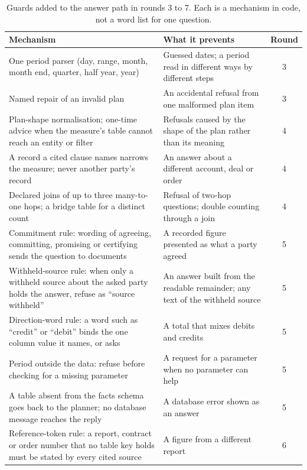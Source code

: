 \begin{table}[H]
\centering\small
\caption{Guards added to the answer path in rounds 3 to 7. Each is a mechanism in code, not a word list for one question.}
\label{tab:answer-guards}
\begin{tabular}{p{5.6cm}p{6.4cm}c}
\toprule
Mechanism & What it prevents & Round\\\midrule
One period parser (day, range, month, month end, quarter, half year, year) & Guessed dates; a period read in different ways by different steps & 3\\
Named repair of an invalid plan & An accidental refusal from one malformed plan item & 3\\
Plan-shape normalisation; one-time advice when the measure's table cannot reach an entity or filter & Refusals caused by the shape of the plan rather than its meaning & 4\\
A record a cited clause names narrows the measure; never another party's record & An answer about a different account, deal or order & 4\\
Declared joins of up to three many-to-one hops; a bridge table for a distinct count & Refusal of two-hop questions; double counting through a join & 4\\
Commitment rule: wording of agreeing, committing, promising or certifying sends the question to documents & A recorded figure presented as what a party agreed & 5\\
Withheld-source rule: when only a withheld source about the asked party holds the answer, refuse as ``source withheld'' & An answer built from the readable remainder; any text of the withheld source & 5\\
Direction-word rule: a word such as ``credit'' or ``debit'' binds the one column value it names, or asks & A total that mixes debits and credits & 5\\
Period outside the data: refuse before checking for a missing parameter & A request for a parameter when no parameter can help & 5\\
A table absent from the facts schema goes back to the planner; no database message reaches the reply & A database error shown as an answer & 5\\
Reference-token rule: a report, contract or order number that no table key holds must be stated by every cited source & A figure from a different report & 6\\

\end{tabular}
\end{table}
